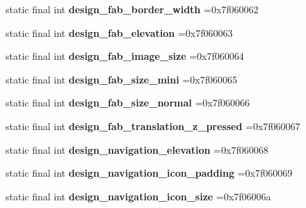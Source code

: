 \begin{DoxyCompactItemize}
static final int {\bfseries design\+\_\+fab\+\_\+border\+\_\+width} =0x7f060062
\item 
\mbox{\label{classproject4_1_1xaria_1_1R_1_1dimen_acb936c31c1fd09d0b6e6c07fee118df1}} 
static final int {\bfseries design\+\_\+fab\+\_\+elevation} =0x7f060063
\item 
\mbox{\label{classproject4_1_1xaria_1_1R_1_1dimen_a5388b78924e5877fc45812f69bbce511}} 
static final int {\bfseries design\+\_\+fab\+\_\+image\+\_\+size} =0x7f060064
\item 
\mbox{\label{classproject4_1_1xaria_1_1R_1_1dimen_a03bb5f38584484034cb9ac56d1fc794c}} 
static final int {\bfseries design\+\_\+fab\+\_\+size\+\_\+mini} =0x7f060065
\item 
\mbox{\label{classproject4_1_1xaria_1_1R_1_1dimen_ab9d868d704437ff77de068045fc7bd65}} 
static final int {\bfseries design\+\_\+fab\+\_\+size\+\_\+normal} =0x7f060066
\item 
\mbox{\label{classproject4_1_1xaria_1_1R_1_1dimen_a5e30712244714c60104aede41209794b}} 
static final int {\bfseries design\+\_\+fab\+\_\+translation\+\_\+z\+\_\+pressed} =0x7f060067
\item 
\mbox{\label{classproject4_1_1xaria_1_1R_1_1dimen_a65dd996efa60adedc7fc09f7bce2a154}} 
static final int {\bfseries design\+\_\+navigation\+\_\+elevation} =0x7f060068
\item 
\mbox{\label{classproject4_1_1xaria_1_1R_1_1dimen_ab66b64964a1efb569dc97bfc82a3c4da}} 
static final int {\bfseries design\+\_\+navigation\+\_\+icon\+\_\+padding} =0x7f060069
\item 
\mbox{\label{classproject4_1_1xaria_1_1R_1_1dimen_a6d73854cbdacfdf45fa9e422c74a94f2}} 
static final int {\bfseries design\+\_\+navigation\+\_\+icon\+\_\+size} =0x7f06006a
\item 
\mbox{\label{classproject4_1_1xaria_1_1R_1_1dimen_a69b48bac8b079152de447360d0e3eb30}} 

\end{DoxyCompactItemize}
